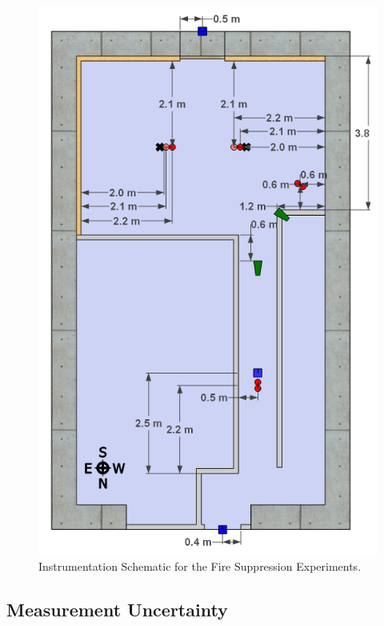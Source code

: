 \documentclass[12pt,oneside]{book}
\begin{document}
\begin{figure}[!ht]
	\includegraphics[width=.8\columnwidth]{../Figures/Pictures/DelCoSingleStoryInstrumentationDimensions}
	\caption{Instrumentation Schematic for the Fire Suppression Experiments.}
	\label{fig:Fire_Suppression_Instrumentation_Dimensions}
\end{figure}

\clearpage

\subsection{Measurement Uncertainty}
\label{subsec:Uncertainty}
\end{document}
